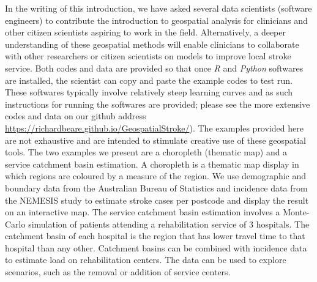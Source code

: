 \documentclass[utf8]{frontiersHLTH}
\begin{document}
{In the writing of this introduction, we have asked several data
scientists (software engineers) to contribute the introduction to
geospatial analysis for clinicians and other citizen scientists
aspiring to work in the field. Alternatively, a deeper understanding
of these geospatial methods will enable clinicians to collaborate with
other researchers or citizen scientists on models to improve local
stroke service. Both codes and data are provided so that once {\em R} and
{\em Python} softwares are installed, the scientist can copy and paste the
example codes to test run. These softwares typically involve
relatively steep learning curves and as such instructions for running
the softwares are provided; please see the more extensive codes and
data on our github address \href{https://richardbeare.github.io/GeospatialStroke/}{https://richardbeare.github.io/GeospatialStroke/}).
The examples provided here are not exhaustive and are
intended to stimulate creative use of these geospatial tools. The two
examples we present are a choropleth (thematic map) and a service
catchment basin estimation. A choropleth is a thematic map display in
which regions are coloured by a measure of the region. We use
demographic and boundary data from the Australian Bureau of Statistics
and incidence data from the NEMESIS
\cite{thrift_stroke_2000,azarpazhooh2008patterns} study to estimate
stroke cases per postcode and display the result on an interactive
map. The service catchment basin estimation involves a Monte-Carlo
simulation of patients attending a rehabilitation service of 3
hospitals. The catchment basin of each hospital is the region that has
lower travel time to that hospital than any other. Catchment basins
can be combined with incidence data to estimate load on rehabilitation
centers. The data can be used to explore scenarios, such as the
removal or addition of service centers.
}
\end{document}
